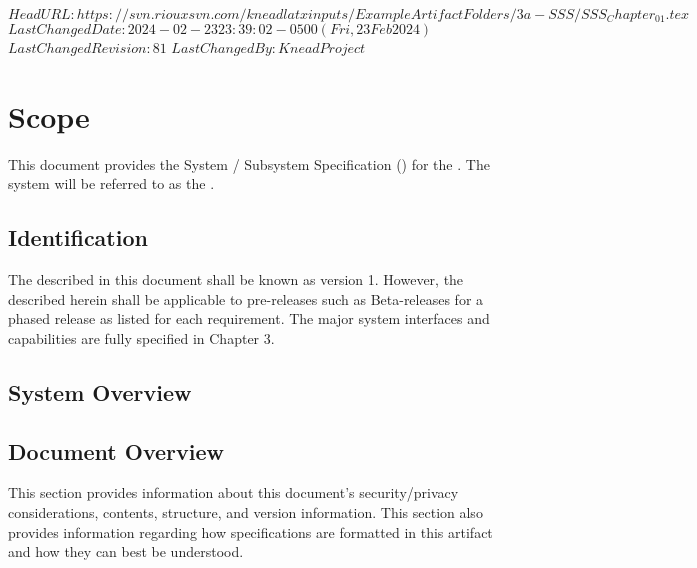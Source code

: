 \svnidlong
{$HeadURL: https://svn.riouxsvn.com/kneadlatxinputs/ExampleArtifactFolders/3a-SSS/SSS_Chapter_01.tex $}
{$LastChangedDate: 2024-02-23 23:39:02 -0500 (Fri, 23 Feb 2024) $}
{$LastChangedRevision: 81 $}
{$LastChangedBy: KneadProject $}

\chapter{Scope}
\label{loc:Scope}
% 

This document provides the System / Subsystem Specification (\SSS) for the \ThisSystem. 
The system will be referred to as the \ThisSys.


\section{Identification}
\label{loc:Identification}
% 

The \ThisSystem described in this document shall be known as \ThisSys version 1.
However, the \SSS described herein shall be applicable to pre-releases such as Beta-releases for a phased release as listed for each requirement.
The major system interfaces and capabilities are fully specified in Chapter 3.


\section{System Overview}
\label{loc:SystemOverview}
% 




\newpage
\section{Document Overview}
\label{loc:DocumentOverview}
% 

This section provides information about this document's security/privacy considerations, contents, structure, and version information.
This section also provides information regarding how specifications are formatted in this artifact and how they can best be understood.





